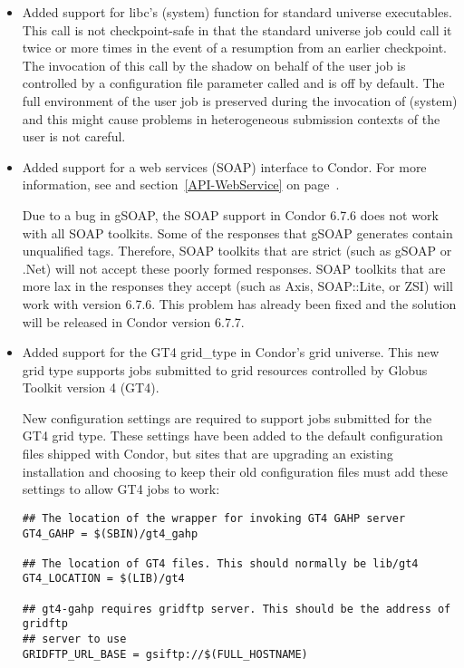 \begin{itemize}

\item Added support for libc's \Syscall(system) function for standard
	universe executables. This call is not checkpoint-safe in that
	the standard universe job could call it twice or more times
	in the event of a resumption from an earlier checkpoint. The
	invocation of this call by the shadow on behalf of the user
	job is controlled by a configuration file parameter called
	 and is off by default.
	The full environment of the user job is preserved during the
	invocation of \Syscall(system) and this might cause problems in 
	heterogeneous submission contexts of the user is not careful.

\item Added support for a web services (SOAP) interface to Condor.
  For more information, see and section~\ref{API-WebService} on
  page~\pageref{API-WebService}.

  \Note Due to a bug in gSOAP, the SOAP support in Condor 6.7.6 does
  not work with all SOAP toolkits.
  Some of the responses that gSOAP generates contain unqualified tags.
  Therefore, SOAP toolkits that are strict (such as gSOAP or .Net)
  will not accept these poorly formed responses.
  SOAP toolkits that are more lax in the responses they accept (such
  as Axis, SOAP::Lite, or ZSI) will work with version 6.7.6.
  This problem has already been fixed and the solution will be
  released in Condor version 6.7.7.

\item Added support for the GT4 grid\_type in Condor's grid universe.
  This new grid type supports jobs submitted to grid resources
  controlled by Globus Toolkit version 4 (GT4).

  New configuration settings are required to support jobs
  submitted for the GT4 grid type.
  These settings have been added to the default configuration files
  shipped with Condor, but sites that are upgrading an existing
  installation and choosing to keep their old configuration files must
  add these settings to allow GT4 jobs to work:
\begin{verbatim}
## The location of the wrapper for invoking GT4 GAHP server
GT4_GAHP = $(SBIN)/gt4_gahp
 
## The location of GT4 files. This should normally be lib/gt4
GT4_LOCATION = $(LIB)/gt4

## gt4-gahp requires gridftp server. This should be the address of gridftp
## server to use
GRIDFTP_URL_BASE = gsiftp://$(FULL_HOSTNAME)
\end{verbatim}


\end{itemize}
